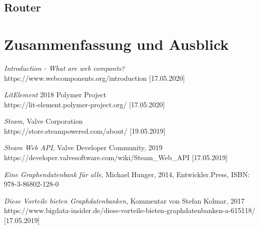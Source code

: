 \documentclass[12pt,					%
							 oneside,			%
							 a4paper,			%
							 halfparskip,		%
							 liststotoc,			%
							 bibtotoc,			%
							 fleqn,				%
							 pointlessnumbers]	%
							 {scrreprt}
\begin{document}
	\section{Router}



\chapter{Zusammenfassung und Ausblick}     


		
	
	
	\nocite{*}						%


\begin{thebibliography}{unsrt}
 \textit{Introduction - What are web componts?} \\
https://www.webcomponents.org/introduction [17.05.2020]

 \textit{LitElement} 2018 Polymer Project\\
https://lit-element.polymer-project.org/ [17.05.2020]

 \textit{Steam}, Valve Corporation\\
https://store.steampowered.com/about/ [19.05.2019]

 \textit{Steam Web API}, Valve Developer Community, 2019 \\
https://developer.valvesoftware.com/wiki/Steam\_Web\_API [17.05.2019]

 \textit{Eine Graphendatenbank für alle}, Michael Hunger, 2014, Entwickler.Press, ISBN: 978-3-86802-128-0

 \textit{Diese Vorteile bieten Graphdatenbanken}, Kommentar von Stefan Kolmar, 2017\\
https://www.bigdata-insider.de/diese-vorteile-bieten-graphdatenbanken-a-615118/ [17.05.2019]


\end{thebibliography}	

	\listoffigures						%
\end{document}
